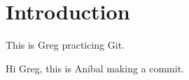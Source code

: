 
\section{Introduction} \label{s:introduction}

This is Greg practicing Git.

Hi Greg, this is Anibal making a commit.